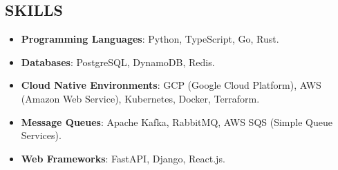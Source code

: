 \subsection*{SKILLS}

\begin{itemize}[leftmargin=*,labelsep=1mm]
  \setlength{\parskip}{0mm}
  \setlength{\itemsep}{1mm}
  \item \textbf{Programming Languages}: Python, TypeScript, Go, Rust.
  \item \textbf{Databases}: PostgreSQL, DynamoDB, Redis.
  \item \textbf{Cloud Native Environments}: GCP (Google Cloud Platform), AWS (Amazon Web Service),
    Kubernetes, Docker, Terraform.
  \item \textbf{Message Queues}: Apache Kafka, RabbitMQ, AWS SQS (Simple Queue Services).
  \item \textbf{Web Frameworks}: FastAPI, Django, React.js.
\end{itemize}
